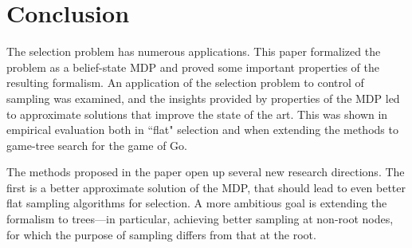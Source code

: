 \section{Conclusion}

The selection problem has numerous applications. This paper formalized the
problem as a belief-state MDP and proved some important properties of the 
resulting formalism. An application of the selection problem to control of
sampling was examined, and the insights provided by properties of the MDP 
led to approximate solutions that improve the state of the art. This was
shown in empirical evaluation both in ``flat" selection and when extending
the methods to game-tree search for the game of Go.

The methods proposed in the paper open up several new research
directions. The first is a better approximate solution of the MDP,
that should lead to even better flat sampling algorithms for
selection. A more ambitious goal is extending the formalism to
trees---in particular, achieving better sampling at non-root nodes,
for which the purpose of sampling differs from that at the root.
